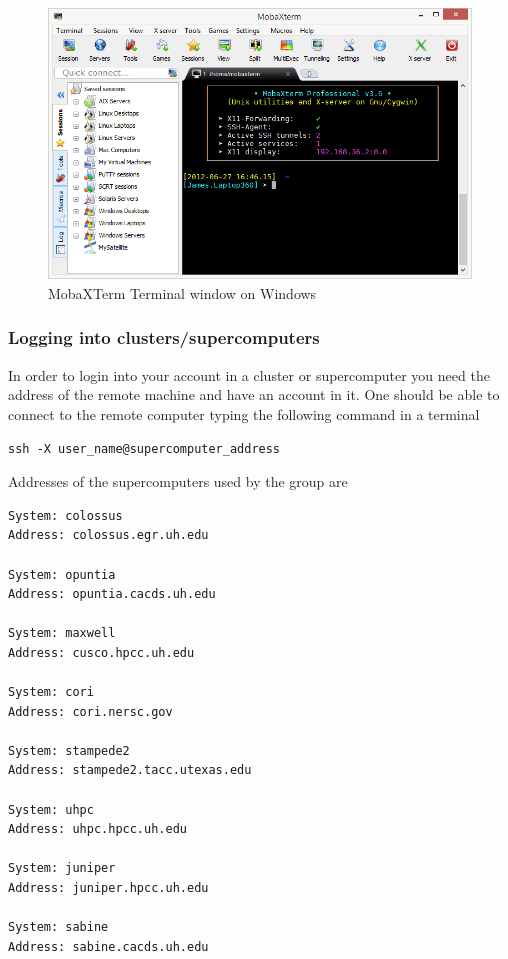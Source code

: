 \documentclass[11pt]{article}
\makeatletter
\def\maxwidth{\ifdim\Gin@nat@width>\linewidth\linewidth
    \else\Gin@nat@width\fi}
\let\Oldincludegraphics\includegraphics
\renewcommand{\includegraphics}[1]{\Oldincludegraphics[width=.8\maxwidth]{#1}}
\makeatother
\begin{document}
\begin{figure}
\centering
\includegraphics{figures/moba.png}
\caption{MobaXTerm Terminal window on Windows}
\end{figure}

    \subsubsection{Logging into
clusters/supercomputers}\label{logging-into-clusterssupercomputers}

In order to login into your account in a cluster or supercomputer you
need the address of the remote machine and have an account in it. One
should be able to connect to the remote computer typing the following
command in a terminal

\begin{verbatim}
ssh -X user_name@supercomputer_address
\end{verbatim}

Addresses of the supercomputers used by the group are

\begin{verbatim}
System: colossus
Address: colossus.egr.uh.edu

System: opuntia
Address: opuntia.cacds.uh.edu

System: maxwell 
Address: cusco.hpcc.uh.edu

System: cori
Address: cori.nersc.gov

System: stampede2
Address: stampede2.tacc.utexas.edu

System: uhpc
Address: uhpc.hpcc.uh.edu

System: juniper
Address: juniper.hpcc.uh.edu

System: sabine
Address: sabine.cacds.uh.edu
\end{verbatim}
\end{document}
